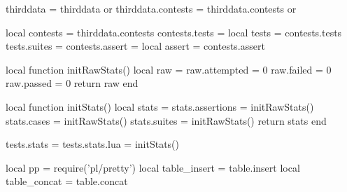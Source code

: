 thirddata          = thirddata          or {}
thirddata.contests = thirddata.contests or {}

local contests  = thirddata.contests
contests.tests  = {}
local tests     = contests.tests
tests.suites    = {}
contests.assert = {}
local assert    = contests.assert

local function initRawStats()
  local raw = {}
  raw.attempted = 0
  raw.failed    = 0
  raw.passed    = 0
  return raw
end

local function initStats()
  local stats = {}
  stats.assertions = initRawStats()
  stats.cases      = initRawStats()
  stats.suites     = initRawStats()
  return stats
end

tests.stats     = {}
tests.stats.lua = initStats()

local pp = require('pl/pretty')
local table_insert = table.insert
local table_concat = table.concat

\stopLuaCode

\stopchapter